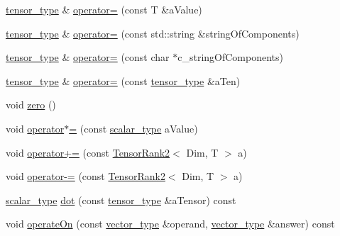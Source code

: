 \begin{DoxyCompactItemize}
\item 
\hyperlink{classcofe_1_1TensorRank2_a3af9468088af4836c93808edaceb03b0}{tensor\-\_\-type} \& \hyperlink{classcofe_1_1TensorRank2_a974de1ac866a442b71c7585f93d7b700}{operator=} (const T \&a\-Value)
\item 
\hyperlink{classcofe_1_1TensorRank2_a3af9468088af4836c93808edaceb03b0}{tensor\-\_\-type} \& \hyperlink{classcofe_1_1TensorRank2_aa13f3b43175c50377dc7be1b3b4ba0e1}{operator=} (const std\-::string \&string\-Of\-Components)
\item 
\hyperlink{classcofe_1_1TensorRank2_a3af9468088af4836c93808edaceb03b0}{tensor\-\_\-type} \& \hyperlink{classcofe_1_1TensorRank2_a06e9b0f1029f40caef19846aac685229}{operator=} (const char $\ast$c\-\_\-string\-Of\-Components)
\item 
\hyperlink{classcofe_1_1TensorRank2_a3af9468088af4836c93808edaceb03b0}{tensor\-\_\-type} \& \hyperlink{classcofe_1_1TensorRank2_a67244381f61e945177a82d50954fcb9c}{operator=} (const \hyperlink{classcofe_1_1TensorRank2_a3af9468088af4836c93808edaceb03b0}{tensor\-\_\-type} \&a\-Ten)
\item 
void \hyperlink{classcofe_1_1TensorRank2_a7f85e87ad4469c630444074f245bfe85}{zero} ()
\item 
void \hyperlink{classcofe_1_1TensorRank2_a4fd70229db0582dbefb468643e67edd5}{operator$\ast$=} (const \hyperlink{classcofe_1_1TensorRank2_a3dce726b0c34912c6549a5911f478eaf}{scalar\-\_\-type} a\-Value)
\item 
void \hyperlink{classcofe_1_1TensorRank2_ae48aa87bd29405aad324ec5d3e593b26}{operator+=} (const \hyperlink{classcofe_1_1TensorRank2}{Tensor\-Rank2}$<$ Dim, T $>$ a)
\item 
void \hyperlink{classcofe_1_1TensorRank2_a87cadb5aaf319212f4948516c0152e61}{operator-\/=} (const \hyperlink{classcofe_1_1TensorRank2}{Tensor\-Rank2}$<$ Dim, T $>$ a)
\item 
\hyperlink{classcofe_1_1TensorRank2_a3dce726b0c34912c6549a5911f478eaf}{scalar\-\_\-type} \hyperlink{classcofe_1_1TensorRank2_af21522a579144b568613c850c6856ce1}{dot} (const \hyperlink{classcofe_1_1TensorRank2_a3af9468088af4836c93808edaceb03b0}{tensor\-\_\-type} \&a\-Tensor) const 
\item 
void \hyperlink{classcofe_1_1TensorRank2_aa0f9fe988669a1b2234e1c4ad631c4c4}{operate\-On} (const \hyperlink{classcofe_1_1TensorRank2_a5c3ced2bb8f6574ba2ce2e1dab9d2c0b}{vector\-\_\-type} \&operand, \hyperlink{classcofe_1_1TensorRank2_a5c3ced2bb8f6574ba2ce2e1dab9d2c0b}{vector\-\_\-type} \&answer) const 
\item 

\end{DoxyCompactItemize}
